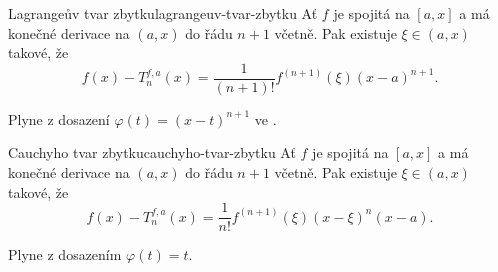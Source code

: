 \begin{corollary}{Lagrangeův tvar zbytku}{lagrangeuv-tvar-zbytku}
 Ať $f$ je spojitá na $[a,x]$ a má konečné derivace na $(a,x)$ do řádu $n+1$
 včetně. Pak existuje $\xi \in (a,x)$ takové, že
 \[
  f(x) - T^{f,a}_n(x) = \frac{1}{(n+1)!}f^{(n+1)}(\xi)(x-a)^{n+1}.
 \]
\end{corollary}
\begin{corproof}
 Plyne z dosazení $\varphi(t) = (x-t)^{n+1}$ ve
 .
\end{corproof}

\begin{corollary}{Cauchyho tvar zbytku}{cauchyho-tvar-zbytku}
 Ať $f$ je spojitá na $[a,x]$ a má konečné derivace na $(a,x)$ do řádu $n + 1$
 včetně. Pak existuje $\xi \in (a,x)$ takové, že
 \[
  f(x) - T^{f,a}_n(x) = \frac{1}{n!}f^{(n+1)}(\xi)(x-\xi)^{n}(x-a).
 \]
\end{corollary}
\begin{corproof}
 Plyne z  dosazením $\varphi(t) = t$.
\end{corproof}
